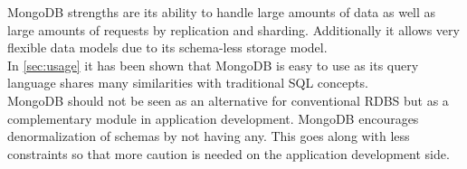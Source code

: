 MongoDB strengths are its ability to handle large amounts of data as well as
large amounts of requests by replication and sharding. Additionally it allows
very flexible data models due to its schema-less storage model.\\
In \autoref{sec:usage} it has been shown that MongoDB is easy to use as its
query language shares many similarities with traditional SQL concepts.\\
MongoDB should not be seen as an alternative for conventional RDBS but as a
complementary module in application development. MongoDB encourages
denormalization of schemas by not having any. This goes along with less
constraints so that more caution is needed on the application development side.





\newpage \begin{appendices} 
\appendixtocon %

\appendixpage %

\subsection*{\listappendixname}
\listofappendices

\newpage

\begin{subappendices}
\renewcommand{\setthesubsection}{\arabic{subsection}:}%

\label{apx:placeholder}

\end{subappendices}
\end{appendices}
